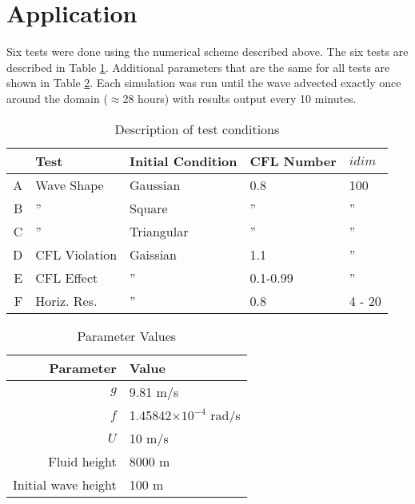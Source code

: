 \documentclass[11pt,twoside]{article}
\begin{document}
%
%
\section{Application}

Six tests were done using the numerical scheme described above. The six tests are described in Table \ref{tab:tests}.  Additional parameters that are the same for all tests are shown in Table \ref{tab:pars}.  Each simulation was run until the wave advected exactly once around the domain ($\approx$28 hours) with results output every 10 minutes. 

\begin{table}[!h]
\centering
\caption{Description of test conditions}\label{tab:tests}
\begin{tabular}{rllll} 
\toprule
  & Test          & Initial Condition & CFL Number & $idim$\\
\midrule
A & Wave Shape    & Gaussian          & 0.8        & 100   \\
B & ''            & Square            & ''         & ''    \\
C & ''            & Triangular        & ''         & ''    \\
D & CFL Violation & Gaissian          & 1.1        & ''    \\
E & CFL Effect    & ''                & 0.1-0.99   & ''    \\
F & Horiz. Res.   & ''                & 0.8        & 4 - 20\\
\bottomrule
\end{tabular}
\end{table}

\begin{table}[!h]
\centering
\caption{Parameter Values}\label{tab:pars}
\begin{tabular}{rl} 
\toprule
 Parameter & Value   \\
\midrule
$g$ & 9.81 m/s   \\
$f$ &  1.45842$\times 10^{-4}$  rad/s        \\
$U$ & 10 m/s           \\
Fluid height & 8000 m\\
Initial wave height & 100 m\\
\bottomrule
\end{tabular}
\end{table}


%
%
\end{document}
